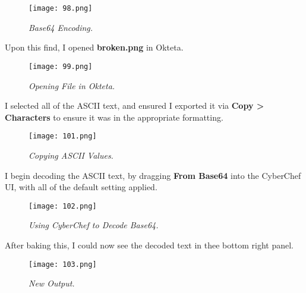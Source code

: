 \begin{figure}[H]
    \setlength{\abovecaptionskip}{20pt}
    \setlength{\belowcaptionskip}{0pt}
    \centering
    \texttt{[image: 98.png]}
    \captionsetup{justification=centering}
    \caption{\textit{Base64 Encoding.}}
    \label{fig:98}
\end{figure}
\vspace{-10pt}

Upon this find, I opened \textbf{broken.png} in Okteta. 

\begin{figure}[H]
    \setlength{\abovecaptionskip}{20pt}
    \setlength{\belowcaptionskip}{0pt}
    \centering
    \texttt{[image: 99.png]}
    \captionsetup{justification=centering}
    \caption{\textit{Opening File in Okteta.}}
    \label{fig:99}
\end{figure}
\vspace{-10pt}

I selected all of the ASCII text, and ensured I exported it via \textbf{Copy > Characters} to ensure it was in the appropriate formatting.

\begin{figure}[H]
    \setlength{\abovecaptionskip}{20pt}
    \setlength{\belowcaptionskip}{0pt}
    \centering
    \texttt{[image: 101.png]}
    \captionsetup{justification=centering}
    \caption{\textit{Copying ASCII Values.}}
    \label{fig:101}
\end{figure}
\vspace{-10pt}

I begin decoding the ASCII text, by dragging \textbf{From Base64} into the CyberChef UI, with all of the default setting applied.

\begin{figure}[H]
    \setlength{\abovecaptionskip}{20pt}
    \setlength{\belowcaptionskip}{0pt}
    \centering
    \texttt{[image: 102.png]}
    \captionsetup{justification=centering}
    \caption{\textit{Using CyberChef to Decode Base64.}}
    \label{fig:102}
\end{figure}
\vspace{-10pt}

After baking this, I could now see the decoded text in thee bottom right panel.

\begin{figure}[H]
    \setlength{\abovecaptionskip}{20pt}
    \setlength{\belowcaptionskip}{0pt}
    \centering
    \texttt{[image: 103.png]}
    \captionsetup{justification=centering}
    \caption{\textit{New Output.}}
    \label{fig:103}
\end{figure}
\vspace{-10pt}

